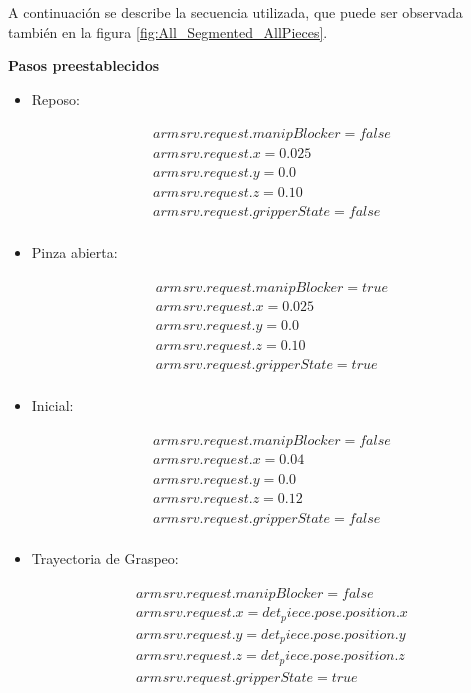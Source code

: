 A continuación se describe la secuencia utilizada, que puede ser observada también en la figura \ref{fig:All_Segmented_AllPieces}.



\textbf{Pasos preestablecidos}
\begin{itemize}
    \item Reposo:
    \begin{multline*}
        \phantom{holis}\\
        arm_{}srv.request.manipBlocker = false\\
        arm_{}srv.request.x = 0.025\\
        arm_{}srv.request.y = 0.0\\
        arm_{}srv.request.z = 0.10\\
        arm_{}srv.request.gripperState = false\\
    \end{multline*}
    \item Pinza abierta:
    \begin{multline*}
        \phantom{holis}\\
        arm_{}srv.request.manipBlocker = true\\
        arm_{}srv.request.x = 0.025\\
        arm_{}srv.request.y = 0.0\\
        arm_{}srv.request.z = 0.10\\
        arm_{}srv.request.gripperState = true\\
    \end{multline*}
    \item Inicial:
    \begin{multline*}
        \phantom{holis}\\
        arm_{}srv.request.manipBlocker = false\\
        arm_{}srv.request.x = 0.04\\
        arm_{}srv.request.y = 0.0\\
        arm_{}srv.request.z = 0.12\\
        arm_{}srv.request.gripperState = false\\
    \end{multline*}

    \item Trayectoria de Graspeo:
    \begin{multline*}
        \phantom{holis}\\
        arm_{}srv.request.manipBlocker = false\\
        arm_{}srv.request.x = det_piece.pose.position.x\\
        arm_{}srv.request.y = det_piece.pose.position.y\\
        arm_{}srv.request.z = det_piece.pose.position.z\\
        arm_{}srv.request.gripperState = true\\
    \end{multline*}
    

\end{itemize}
